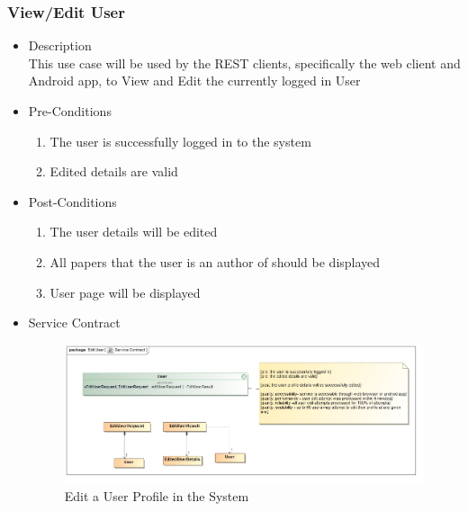 \documentclass[a4paper,10pt]{article}
\begin{document}
\subsubsection{View/Edit User}
	\begin{itemize}
		\item Description\\
			This use case will be used by the REST clients, specifically the web client and Android app, to View and Edit the currently logged in User
		\item Pre-Conditions
			\begin{enumerate}
				\item The user is successfully logged in to the system
				\item Edited details are valid
			\end{enumerate}
		\item Post-Conditions
			\begin{enumerate}
				\item The user details will be edited
				\item All papers that the user is an author of should be displayed 
				\item User page will be displayed
						
			\end{enumerate}
		\item Service Contract
				\begin{figure}[H]
				\includegraphics[scale=0.5]{Edit_User}
				\caption{Edit a User Profile in the System}	
				\end{figure}
	\end{itemize}
\end{document}
